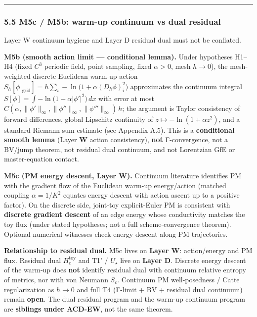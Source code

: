 \documentclass[
  11pt,
]{article}
\begin{document}
\begin{center}\rule{0.5\linewidth}{0.5pt}\end{center}

\subsubsection{5.5 M5c / M5b: warm-up continuum vs dual
residual}\label{m5c-m5b-warm-up-continuum-vs-dual-residual}

Layer W continuum hygiene and Layer D residual dual must not be
conflated.

\textbf{M5b (smooth action limit --- conditional lemma).} Under
hypotheses H1--H4 (fixed \(C^3\) periodic field, point sampling, fixed
\(\alpha>0\), mesh \(h\to 0\)), the mesh-weighted discrete Euclidean
warm-up action
\(S_h[\phi|_{\mathrm{grid}}]=h\sum_i -\ln\bigl(1+\alpha(D_h\phi)_i^2\bigr)\)
approximates the continuum integral
\(S[\phi]=\int -\ln\bigl(1+\alpha|\phi'|^2\bigr)\,dx\) with error at
most
\(C(\alpha,\|\phi'\|_\infty,\|\phi''\|_\infty,\|\phi'''\|_\infty)\,h\);
the argument is Taylor consistency of forward differences, global
Lipschitz continuity of \(z\mapsto -\ln(1+\alpha z^2)\), and a standard
Riemann-sum estimate (see Appendix A.5). This is a \textbf{conditional
smooth lemma} (Layer \textbf{W} action consistency), \textbf{not}
Γ-convergence, not a BV/jump theorem, not residual dual continuum, and
not Lorentzian GfE or master-equation contact.

\textbf{M5c (PM energy descent, Layer W).} Continuum literature
identifies PM with the gradient flow of the Euclidean warm-up
energy/action (matched coupling \(\alpha=1/K^2\) equates energy descent
with action ascent up to a positive factor). On the discrete side,
joint-toy explicit-Euler PM is consistent with \textbf{discrete gradient
descent} of an edge energy whose conductivity matches the toy flux
(under stated hypotheses; not a full scheme-convergence theorem).
Optional numerical witnesses check energy descent along PM trajectories.

\textbf{Relationship to residual dual.} M5c lives on \textbf{Layer W}:
action/energy and PM flux. Residual dual \(H_c^{\mathrm{toy}}\) and T1'
/ \(U_\star\) live on \textbf{Layer D}. Discrete energy descent of the
warm-up does \textbf{not} identify residual dual with continuum relative
entropy of metrics, nor with von Neumann \(S_c\). Continuum PM
well-posedness / Catte regularization as \(h\to 0\) and full T4 (Γ-limit
+ BV + residual dual continuum) remain \textbf{open}. The dual residual
program and the warm-up continuum program are \textbf{siblings under
ACD-EW}, not the same theorem.
\end{document}
